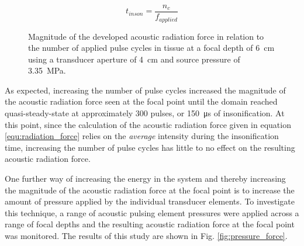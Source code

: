 			\begin{equation}
			\label{equ:insonification_time}
				t_{inson} = \frac{n_c}{f_{applied}}
			\end{equation}

			\begin{figure}[!htb]
				\centering
				\caption[Magnitude of developed acoustic radiation force in relation to the number of applied pulse cycles]{Magnitude of the developed acoustic radiation force in relation to the number of applied pulse cycles in tissue at a focal depth of \SI{6}{\cm} using a transducer aperture of \SI{4}{\cm} and source pressure of \SI{3.35}{\MPa}.}
				\label{fig:pulse_cycles_force}
			\end{figure}

			As expected, increasing the number of pulse cycles increased the magnitude of the acoustic radiation force seen at the focal point until the domain reached quasi-steady-state at approximately 300 pulses, or \SI{150}{\us} of insonification. At this point, since the calculation of the acoustic radiation force given in equation \ref{equ:radiation_force} relies on the \emph{average} intensity during the insonification time, increasing the number of pulse cycles has little to no effect on the resulting acoustic radiation force.

			One further way of increasing the energy in the system and thereby increasing the magnitude of the acoustic radiation force at the focal point is to increase the amount of pressure applied by the individual transducer elements.  To investigate this technique, a range of acoustic pulsing element pressures were applied across a range of focal depths and the resulting acoustic radiation force at the focal point was monitored. The results of this study are shown in Fig. \ref{fig:pressure_force}.

